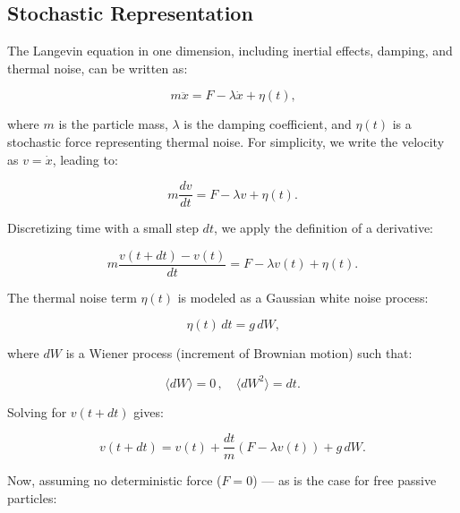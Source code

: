 \subsection{Stochastic Representation}

The Langevin equation \cite{uhlenbeck1930theory} in one dimension, including inertial effects, damping, and thermal noise, can be written as:

\begin{equation}
  m\ddot{x} = F - \lambda \dot{x} + \eta(t)\text{,}
  \label{eq:newton}
\end{equation}

where $m$ is the particle mass, $\lambda$ is the damping coefficient, and $\eta(t)$ is a stochastic force representing thermal noise. For simplicity, we write the velocity as $v = \dot{x}$, leading to:

\begin{equation}
  m\frac{dv}{dt} = F - \lambda v + \eta(t)\text{.}
  \label{eq:newtonv}
\end{equation}

Discretizing time with a small step $dt$, we apply the definition of a derivative:

\begin{equation}
  m \frac{v(t + dt) - v(t)}{dt} = F - \lambda v(t) + \eta(t)\text{.}
  \label{eq:newtonderivative}
\end{equation}

The thermal noise term $\eta(t)$ is modeled as a Gaussian white noise process:

\begin{equation}
  \eta(t)\, dt = g\, dW\text{,}
  \label{eq:eta}
\end{equation}

where $dW$ is a Wiener process (increment of Brownian motion) such that:

\begin{equation}
  \langle dW \rangle = 0\,, \quad \langle dW^2 \rangle = dt\text{.}
  \label{eq:meanvariance}
\end{equation}

Solving for $v(t + dt)$ gives:

\begin{equation}
  v(t + dt) = v(t) + \frac{dt}{m}(F - \lambda v(t)) + g\, dW\text{.}
  \label{eq:velocityplusone}
\end{equation}

Now, assuming no deterministic force ($F = 0$) — as is the case for free passive particles:

